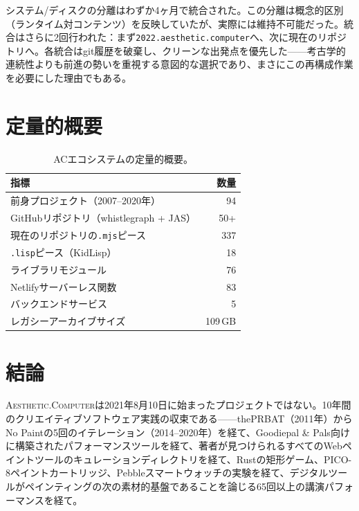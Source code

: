 \documentclass[10pt,letterpaper,twocolumn]{article}
\newcommand{\ac}{\textsc{Aesthetic.Computer}}
\begin{document}
システム/ディスクの分離はわずか4ヶ月で統合された。この分離は概念的区別（ランタイム対コンテンツ）を反映していたが、実際には維持不可能だった。統合はさらに2回行われた：まず\texttt{2022.aesthetic.computer}へ、次に現在のリポジトリへ。各統合はgit履歴を破棄し、クリーンな出発点を優先した——考古学的連続性よりも前進の勢いを重視する意図的な選択であり、まさにこの再構成作業を必要にした理由でもある。


\section{定量的概要}

\begin{table}[h]
\small
\centering
\begin{tabular}{lr}
\toprule
\textbf{指標} & \textbf{数量} \\
\midrule
前身プロジェクト（2007--2020年） & 94 \\
GitHubリポジトリ（whistlegraph + JAS） & 50+ \\
現在のリポジトリの\texttt{.mjs}ピース & 337 \\
\texttt{.lisp}ピース（KidLisp） & 18 \\
ライブラリモジュール & 76 \\
Netlifyサーバーレス関数 & 83 \\
バックエンドサービス & 5 \\
レガシーアーカイブサイズ & 109\,GB \\
\bottomrule
\end{tabular}
\caption{ACエコシステムの定量的概要。}
\end{table}


\section{結論}

\ac{}は2021年8月10日に始まったプロジェクトではない。10年間のクリエイティブソフトウェア実践の収束である——thePRBAT（2011年）からNo Paintの5回のイテレーション（2014--2020年）を経て、Goodiepal \& Pals向けに構築されたパフォーマンスツールを経て、著者が見つけられるすべてのWebペイントツールのキュレーションディレクトリを経て、Rustの矩形ゲーム、PICO-8ペイントカートリッジ、Pebbleスマートウォッチの実験を経て、デジタルツールがペインティングの次の素材的基盤であることを論じる65回以上の講演パフォーマンスを経て。
\end{document}
